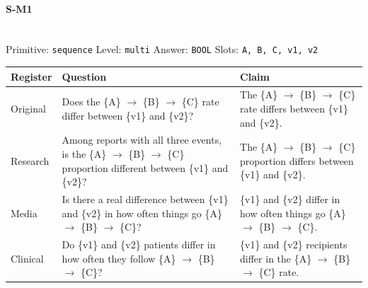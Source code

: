 \documentclass[11pt]{article}
\begin{document}
\paragraph{\textbf{S-M1}}\mbox{}\\
Primitive: \texttt{sequence} \quad Level: \texttt{multi} \quad Answer: \texttt{BOOL} \quad Slots: \texttt{A, B, C, v1, v2}\\[2pt]
\begin{tabularx}{\linewidth}{@{}l L L@{}}
\toprule
\textbf{Register} & \textbf{Question} & \textbf{Claim} \\
\midrule
Original & Does the \{A\} $\rightarrow$  \{B\} $\rightarrow$  \{C\} rate differ between \{v1\} and \{v2\}? & The \{A\} $\rightarrow$  \{B\} $\rightarrow$  \{C\} rate differs between \{v1\} and \{v2\}. \\
Research & Among reports with all three events, is the \{A\} $\rightarrow$  \{B\} $\rightarrow$  \{C\} proportion different between \{v1\} and \{v2\}? & The \{A\} $\rightarrow$  \{B\} $\rightarrow$  \{C\} proportion differs between \{v1\} and \{v2\}. \\
Media & Is there a real difference between \{v1\} and \{v2\} in how often things go \{A\} $\rightarrow$  \{B\} $\rightarrow$  \{C\}? & \{v1\} and \{v2\} differ in how often things go \{A\} $\rightarrow$  \{B\} $\rightarrow$  \{C\}. \\
Clinical & Do \{v1\} and \{v2\} patients differ in how often they follow \{A\} $\rightarrow$  \{B\} $\rightarrow$  \{C\}? & \{v1\} and \{v2\} recipients differ in the \{A\} $\rightarrow$  \{B\} $\rightarrow$  \{C\} rate. \\
\bottomrule
\end{tabularx}
\vspace{4pt}
\end{document}
